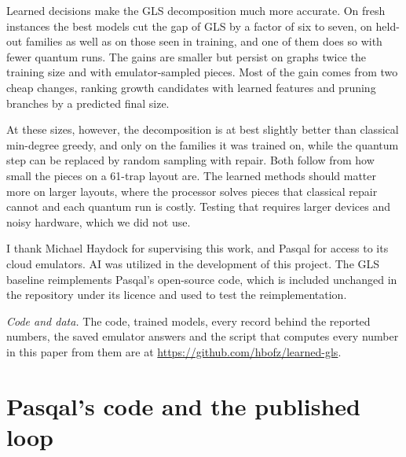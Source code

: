 \documentclass[10pt,pra,aps,twocolumn,superscriptaddress,floatfix,nofootinbib]{revtex4-2}
\newcommand{\GLS}{GLS}
\begin{document}
Learned decisions make the \GLS{} decomposition much more accurate. On fresh instances the best models cut the gap of \GLS{} by a factor of six to seven, on held-out families as well as on those seen in training, and one of them does so with fewer quantum runs. The gains are smaller but persist on graphs twice the training size and with emulator-sampled pieces. Most of the gain comes from two cheap changes, ranking growth candidates with learned features and pruning branches by a predicted final size.

At these sizes, however, the decomposition is at best slightly better than classical min-degree greedy, and only on the families it was trained on, while the quantum step can be replaced by random sampling with repair. Both follow from how small the pieces on a 61-trap layout are. The learned methods should matter more on larger layouts, where the processor solves pieces that classical repair cannot and each quantum run is costly. Testing that requires larger devices and noisy hardware, which we did not use.

\begin{acknowledgments}
I thank Michael Haydock for supervising this work, and Pasqal for access to its cloud emulators. AI was utilized in the development of this project. The \GLS{} baseline reimplements Pasqal's open-source code, which is included unchanged in the repository under its licence and used to test the reimplementation.
\end{acknowledgments}

\textit{Code and data.} The code, trained models, every record behind the reported numbers, the saved emulator answers and the script that computes every number in this paper from them are at \url{https://github.com/hbofz/learned-gls}.

\appendix

\section{Pasqal's code and the published loop}
\label{app:code}
\end{document}
